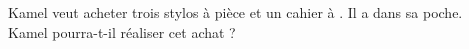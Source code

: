 \begin{exercice*}
   Kamel veut acheter trois stylos à  pièce et un cahier à . Il a  dans sa poche. \\
   Kamel pourra-t-il réaliser cet achat ?
\end{exercice*}
 